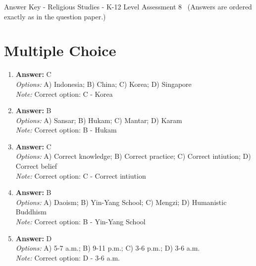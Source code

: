 \documentclass[12pt]{article}
\begin{document}
\begin{center}
Answer Key - Religious Studies - K-12 Level Assessment 8 \
\small (Answers are ordered exactly as in the question paper.)
\end{center}

\section*{Multiple Choice}
\begin{enumerate}[label=\arabic*.]
\item \textbf{Answer:} C
\\ \textit{Options:} A) Indonesia; B) China; C) Korea; D) Singapore
\\ \textit{Note:} Correct option: C - Korea
\item \textbf{Answer:} B
\\ \textit{Options:} A) Sansar; B) Hukam; C) Mantar; D) Karam
\\ \textit{Note:} Correct option: B - Hukam
\item \textbf{Answer:} C
\\ \textit{Options:} A) Correct knowledge; B) Correct practice; C) Correct intiution; D) Correct belief
\\ \textit{Note:} Correct option: C - Correct intiution
\item \textbf{Answer:} B
\\ \textit{Options:} A) Daoism; B) Yin-Yang School; C) Mengzi; D) Humanistic Buddhism
\\ \textit{Note:} Correct option: B - Yin-Yang School
\item \textbf{Answer:} D
\\ \textit{Options:} A) 5-7 a.m.; B) 9-11 p.m.; C) 3-6 p.m.; D) 3-6 a.m.
\\ \textit{Note:} Correct option: D - 3-6 a.m.
\end{enumerate}
\end{document}
